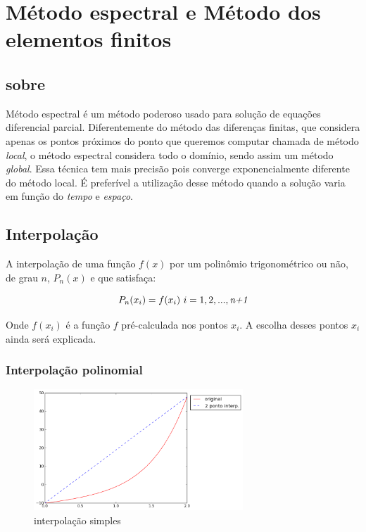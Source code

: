 \chapter{Método espectral e Método dos elementos finitos}
\label{cap:I}
\section{sobre}

 Método espectral é um método poderoso usado para solução de equações diferencial parcial. Diferentemente do método das diferenças finitas, que considera apenas os pontos próximos do ponto que queremos computar chamada de método \emph{local}, o método espectral considera todo o domínio, sendo assim um método \emph{global}. Essa técnica tem mais precisão pois converge exponencialmente diferente do método local. É preferível a utilização desse método quando a solução varia em função do \textit{tempo} e \textit{espaço}.

\section{Interpolação}
 A interpolação de uma função $f(x)$ por um polinômio trigonométrico ou não, de grau $n$, $P_{n}(x)$ e que satisfaça:

\begin{equation}
	P_n (x_i) = f(x_i) \ i = 1,2,...,\emph{n+1}
\end{equation}

 Onde $f(x_i)$ é a função $f$ pré-calculada nos pontos $x_i$. A escolha desses pontos $x_i$ ainda será explicada.

\subsection{Interpolação polinomial}
 \begin{figure}[!ht]
  \includegraphics[width=0.7\textwidth,center]{figuras/interpolacao_linear.png}
  \caption{interpolação simples}
\end{figure}

